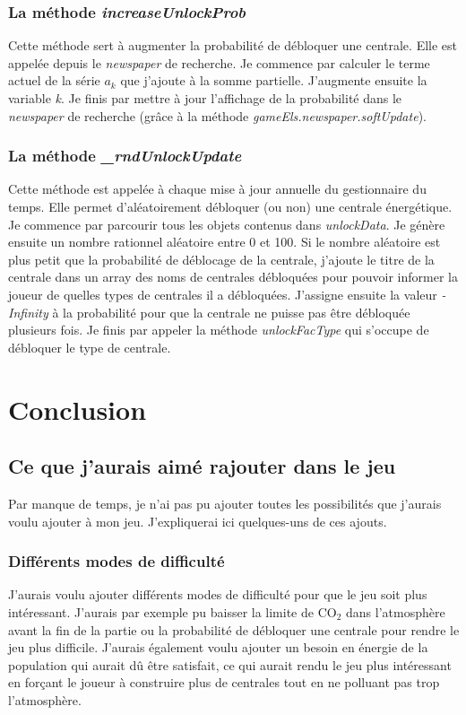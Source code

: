 \documentclass{article}
\begin{document}
        \subsubsection{La méthode \textit{increaseUnlockProb}}
        Cette méthode sert à augmenter la probabilité de débloquer une centrale. Elle est appelée depuis le \textit{newspaper} de recherche.
        Je commence par calculer le terme actuel de la série $a_{k}$ que j'ajoute à la somme partielle. J'augmente ensuite la variable \textit{k}. Je finis par mettre à jour l'affichage de la probabilité dans le \textit{newspaper} de recherche (grâce à la méthode \textit{gameEls.newspaper.softUpdate}).
        
        \subsubsection{La méthode \textit{\_rndUnlockUpdate}} \label{rndUnlockUpdate}
        Cette méthode est appelée à chaque mise à jour annuelle du gestionnaire du temps. Elle permet d'aléatoirement débloquer (ou non) une centrale énergétique. Je commence par parcourir tous les objets contenus dans \textit{unlockData}. Je génère ensuite un nombre rationnel aléatoire entre 0 et 100. Si le nombre aléatoire est plus petit que la probabilité de déblocage de la centrale, j'ajoute le titre de la centrale dans un array des noms de centrales débloquées pour pouvoir informer la joueur de quelles types de centrales il a débloquées. J'assigne ensuite la valeur \textit{-Infinity} à la probabilité pour que la centrale ne puisse pas être débloquée plusieurs fois. Je finis par appeler la méthode \textit{unlockFacType} qui s'occupe de débloquer le type de centrale.
        
        \section{Conclusion}
        \subsection{Ce que j'aurais aimé rajouter dans le jeu} \label{ajoutJeu}
		Par manque de temps, je n'ai pas pu ajouter toutes les possibilités que j'aurais voulu ajouter à mon jeu. J'expliquerai ici quelques-uns de ces ajouts.
		
		\subsubsection{Différents modes de difficulté}
		J'aurais voulu ajouter différents modes de difficulté pour que le jeu soit plus intéressant. J'aurais par exemple pu baisser la limite de CO$_{2}$ dans l'atmosphère avant la fin de la partie ou la probabilité de débloquer une centrale pour rendre le jeu plus difficile. J'aurais également voulu ajouter un besoin en énergie de la population qui aurait dû être satisfait, ce qui aurait rendu le jeu plus intéressant en forçant le joueur à construire plus de centrales tout en ne polluant pas trop l'atmosphère.
		
\end{document}
